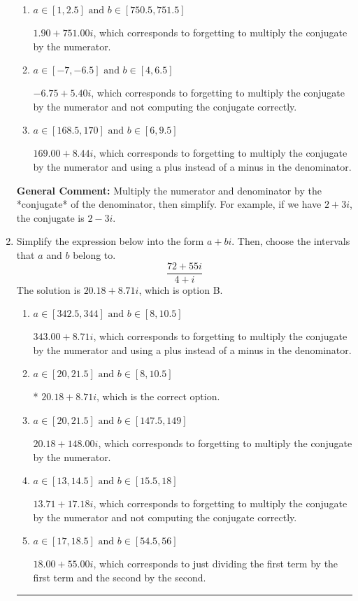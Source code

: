 \documentclass{extbook}[14pt]
\newcommand{\litem}[1]{\item #1

\rule{\textwidth}{0.4pt}}
\begin{document}
\begin{enumerate}
{\begin{enumerate}[label=\Alph*.]
* $1.90  + 8.44 i$, which is the correct option.
\item \( a \in [1, 2.5] \text{ and } b \in [750.5, 751.5] \)

 $1.90  + 751.00 i$, which corresponds to forgetting to multiply the conjugate by the numerator.
\item \( a \in [-7, -6.5] \text{ and } b \in [4, 6.5] \)

 $-6.75  + 5.40 i$, which corresponds to forgetting to multiply the conjugate by the numerator and not computing the conjugate correctly.
\item \( a \in [168.5, 170] \text{ and } b \in [6, 9.5] \)

 $169.00  + 8.44 i$, which corresponds to forgetting to multiply the conjugate by the numerator and using a plus instead of a minus in the denominator.
\end{enumerate}

\textbf{General Comment:} Multiply the numerator and denominator by the *conjugate* of the denominator, then simplify. For example, if we have $2+3i$, the conjugate is $2-3i$.
}
\litem{
Simplify the expression below into the form $a+bi$. Then, choose the intervals that $a$ and $b$ belong to.
\[ \frac{72 + 55 i}{4 + i} \]The solution is \( 20.18  + 8.71 i \), which is option B.\begin{enumerate}[label=\Alph*.]
\item \( a \in [342.5, 344] \text{ and } b \in [8, 10.5] \)

 $343.00  + 8.71 i$, which corresponds to forgetting to multiply the conjugate by the numerator and using a plus instead of a minus in the denominator.
\item \( a \in [20, 21.5] \text{ and } b \in [8, 10.5] \)

* $20.18  + 8.71 i$, which is the correct option.
\item \( a \in [20, 21.5] \text{ and } b \in [147.5, 149] \)

 $20.18  + 148.00 i$, which corresponds to forgetting to multiply the conjugate by the numerator.
\item \( a \in [13, 14.5] \text{ and } b \in [15.5, 18] \)

 $13.71  + 17.18 i$, which corresponds to forgetting to multiply the conjugate by the numerator and not computing the conjugate correctly.
\item \( a \in [17, 18.5] \text{ and } b \in [54.5, 56] \)

 $18.00  + 55.00 i$, which corresponds to just dividing the first term by the first term and the second by the second.
\end{enumerate}

}
\end{enumerate}
\end{document}
